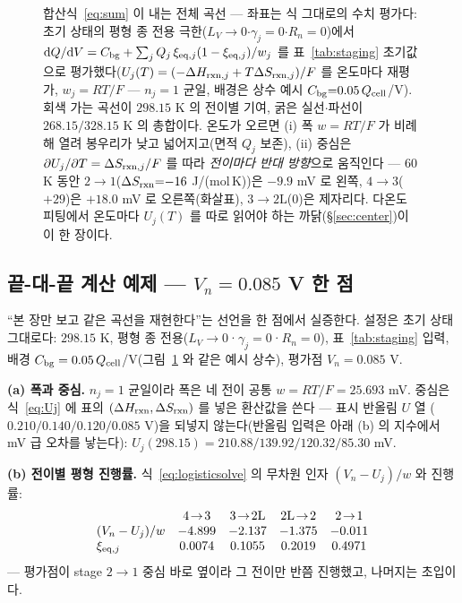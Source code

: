\begin{figure}[t]
\caption{합산식~\eqref{eq:sum} 이 내는 전체 곡선 --- 좌표는 식 그대로의 수치 평가다: 초기 상태의 평형
종 전용 극한($L_V\!\to\!0$$\cdot$$\gamma_j{=}0$$\cdot$$R_n{=}0$)에서
$\mathrm{d} Q/\mathrm{d} V=C_{\mathrm{bg}}+\sum_jQ_j\,\xi_{\mathrm{eq},j}(1-\xi_{\mathrm{eq},j})/w_j$ 를 표~\ref{tab:staging} 초기값으로
평가했다($U_j(T)=(-\Delta H_{\mathrm{rxn},j}+T\Delta S_{\mathrm{rxn},j})/F$ 를 온도마다 재평가, $w_j{=}RT/F$
--- $n_j{=}1$ 균일, 배경은 상수 예시 $C_{\mathrm{bg}}{=}0.05\,Q_{\mathrm{cell}}$/V). 회색 가는 곡선이 $298.15$ K 의
전이별 기여, 굵은 실선$\cdot$파선이 $268.15/328.15$ K 의 총합이다. 온도가 오르면 (i) 폭
$w{=}RT/F$ 가 비례해 열려 봉우리가 낮고 넓어지고(면적 $Q_j$ 보존), (ii) 중심은
$\partial U_j/\partial T=\Delta S_{\mathrm{rxn},j}/F$ 를 따라 \emph{전이마다 반대 방향}으로 움직인다 ---
$60$ K 동안 $2\!\to\!1$($\Delta S_{\mathrm{rxn}}{=}{-}16$ J/(mol\,K))은 $-9.9$ mV 로 왼쪽,
$4\!\to\!3$($+29$)은 $+18.0$ mV 로 오른쪽(화살표), $3\!\to\!2\mathrm L$($0$)은 제자리다. 다온도
피팅에서 온도마다 $U_j(T)$ 를 따로 읽어야 하는 까닭(\S\ref{sec:center})이 이 한 장이다.}
\label{fig:sumcurve}
\end{figure}

\subsection{끝-대-끝 계산 예제 --- $V_n=0.085$ V 한 점}\label{sec:sum-worked}
``본 장만 보고 같은 곡선을 재현한다''는 선언을 한 점에서 실증한다. 설정은 초기 상태 그대로다:
$298.15$ K, 평형 종 전용($L_V\!\to\!0$·$\gamma_j{=}0$·$R_n{=}0$), 표~\ref{tab:staging} 입력,
배경 $C_{\mathrm{bg}}=0.05\,Q_{\mathrm{cell}}$/V(그림~\ref{fig:sumcurve} 와 같은 예시 상수), 평가점 $V_n=0.085$ V.

\textbf{(a) 폭과 중심.} $n_j{=}1$ 균일이라 폭은 네 전이 공통 $w=RT/F=25.693$ mV. 중심은
식~\eqref{eq:Uj} 에 표의 $(\Delta H_{\mathrm{rxn}},\Delta S_{\mathrm{rxn}})$ 를 넣은 환산값을 쓴다 --- 표시 반올림 $U$ 열
($0.210/0.140/0.120/0.085$ V)을 되넣지 않는다(반올림 입력은 아래 (b) 의 지수에서 mV 급 오차를 낳는다):
$U_j(298.15)=210.88/139.92/120.32/85.30$ mV.

\textbf{(b) 전이별 평형 진행률.} 식~\eqref{eq:logisticsolve} 의 무차원 인자 $(V_n-U_j)/w$ 와 진행률:
\[
\begin{array}{lcccc}
 & 4\!\to\!3 & 3\!\to\!2\mathrm L & 2\mathrm L\!\to\!2 & 2\!\to\!1\\
(V_n-U_j)/w & -4.899 & -2.137 & -1.375 & -0.011\\
\xi_{\eq,j} & 0.0074 & 0.1055 & 0.2019 & 0.4971
\end{array}
\]
--- 평가점이 stage $2\!\to\!1$ 중심 바로 옆이라 그 전이만 반쯤 진행했고, 나머지는 초입이다.

